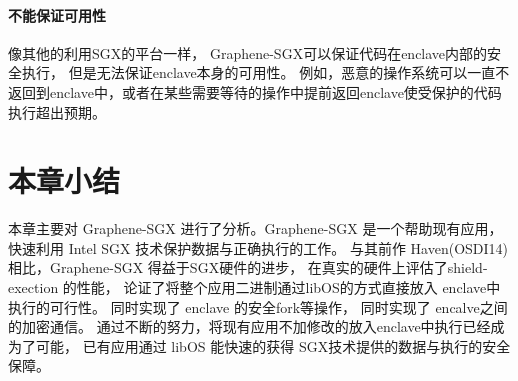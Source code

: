 \paragraph{不能保证可用性}
像其他的利用SGX的平台一样，
Graphene-SGX可以保证代码在enclave内部的安全执行，
但是无法保证enclave本身的可用性。
例如，恶意的操作系统可以一直不返回到enclave中，或者在某些需要等待的操作中提前返回enclave使受保护的代码执行超出预期。

\section{本章小结}
本章主要对 Graphene-SGX 进行了分析。Graphene-SGX 是一个帮助现有应用，
快速利用 Intel SGX 技术保护数据与正确执行的工作。
与其前作 Haven(OSDI14) 相比，Graphene-SGX 得益于SGX硬件的进步，
在真实的硬件上评估了shield-exection 的性能，
论证了将整个应用二进制通过libOS的方式直接放入 enclave中执行的可行性。
同时实现了 enclave 的安全fork等操作，
同时实现了 encalve之间的加密通信。
通过不断的努力，将现有应用不加修改的放入enclave中执行已经成为了可能，
已有应用通过 libOS 能快速的获得 SGX技术提供的数据与执行的安全保障。
